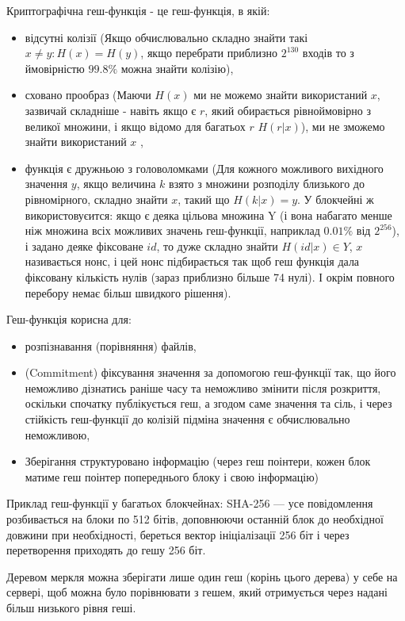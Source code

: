 \documentclass{article}
\begin{document}
    Криптографічна геш-функція - це геш-функція, в якій:
    \begin{itemize}
        \item відсутні колізії (Якщо обчислювально складно знайти такі $ x \neq y: H(x) = H(y) $, якщо перебрати приблизно $2^130$ входів то з ймовірністю $99.8\%$ можна знайти колізію),
        \item сховано прообраз (Маючи $H(x)$ ми не можемо знайти використаний $x$, зазвичай складніше - навіть якщо є $r$, який обирається рівноймовірно з великої множини, і якщо відомо для багатьох $r$ $H(r \vert x)$), ми не зможемо знайти використаний $x$ ,
        \item функція є дружньою з головоломками (Для кожного можливого вихідного значення $y$, якщо величина $k$ взято з множини розподілу близького до рівномірного, складно знайти $x$, такий що $H(k \vert x) = y$. У блокчейні ж використовуєится: якщо є деяка цільова множина Y (і вона набагато менше ніж множина всіх можливих значень геш-функції, наприклад $0.01\%$ від $2^{256}$), і задано деяке фіксоване $id$, то дуже складно знайти $H(id \vert x) \in Y$, $x$ називається нонс, і цей нонс підбирається так щоб геш функція дала фіксовану кількість нулів (зараз приблизно більше 74 нулі). І окрім повного перебору немає більш швидкого рішення).
    \end{itemize}
    Геш-функція корисна для:
    \begin{itemize}
        \item розпізнавання (порівняння) файлів,
        \item (Commitment) фіксування значення за допомогою геш-функції так, що його неможливо дізнатись раніше часу та неможливо змінити після розкриття, оскільки спочатку публікується геш, а згодом саме значення та сіль, і через стійкість геш-функції до колізій підміна значення є обчислювально неможливою,
        \item Зберігання структуровано інформацію (через геш поінтери, кожен блок матиме геш поінтер попереднього блоку і свою інформацію)
    \end{itemize}

    Приклад геш-функції у багатьох блокчейнах: SHA-256 --- усе повідомлення розбивається на блоки по 512 бітів, доповнюючи останній блок до необхідної довжини при необхідності, береться вектор ініціалізації 256 біт і через перетворення приходять до гешу 256 біт.

    Деревом меркля можна зберігати лише один геш (корінь цього дерева) у себе на сервері, щоб можна було порівнювати з гешем, який отримується через надані більш низького рівня геші.
\end{document}

